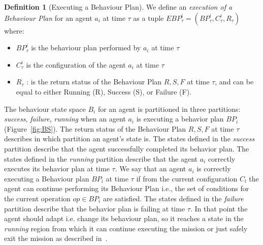 \documentclass[journal]{IEEEtran}
\theoremstyle{definition}
\newtheorem{definition}{Definition}
\newcommand\patrizio[1]{\nb{Patrizio}{#1}}
\newcommand\ivano[1]{\nb{Ivano}{#1}}
\begin{document}
\begin{definition}[Executing a Behaviour Plan]
We define an \textit{execution of a Behaviour Plan} for an agent $a_i$ at time $\tau$ as a tuple $EBP^i_\tau=(BP^i_\tau, C^i_\tau,  R_\tau)$ where: 
\begin{itemize} 
\item $BP^i_\tau$ is the behaviour plan performed by $a_i$ at time $\tau$
\item $C^i_\tau$ is the configuration of the agent $a_i$ at time $\tau$ 
\item $R_\tau$ : is the return status of the Behaviour Plan ${R, S, F}$ at time $\tau$, and can be equal to either Running (R), Success (S), or Failure (F).
\end{itemize}
\end{definition}


The behaviour state space $B_i$ for an agent is partitioned in three partitions: \textit{success}, \textit{failure}, \textit{running} when an agent $a_i$ is executing a behavior plan $BP_i$ (Figure~\ref{fig:BS}). The return status of the Behaviour Plan ${R, S, F}$ at time $\tau$ describes in which partition an agent's state is. The states defined in the \textit{success} partition describe that the agent successfully completed its behavior plan. 
The states defined in the \textit{running} partition describe that the agent $a_i$ correctly executes its behavior plan at time $\tau$. We say that an agent $a_i$ is correctly executing a Behaviour plan $BP_i$ at time $\tau$ if from the current configuration $C_l$ the agent can continue performing its Behaviour Plan i.e., the set of conditions for the current operation $op \in BP_i$ are satisfied. %
The states defined in the \textit{failure} partition describe that the behavior plan is failing at time $\tau$. In that point the agent should adapt i.e. change its behaviour plan, so it reaches a state in the \textit{running} region from which it can continue executing the mission or just safely exit the mission as described in~\cite{di2013engineering}.
\end{document}

